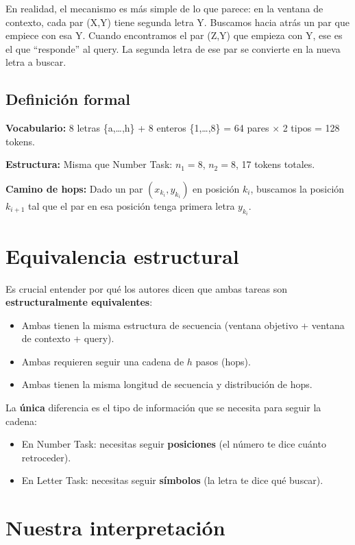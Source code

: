 \documentclass[12pt,a4paper,oneside]{report}
\begin{document}
En realidad, el mecanismo es más simple de lo que parece: en la ventana de contexto, cada par (X,Y) tiene segunda letra Y. Buscamos hacia atrás un par que empiece con esa Y. Cuando encontramos el par (Z,Y) que empieza con Y, ese es el que ``responde'' al query. La segunda letra de ese par se convierte en la nueva letra a buscar.

\subsection{Definición formal}

\textbf{Vocabulario:} 8 letras \{a,\dots,h\} + 8 enteros \{1,\dots,8\} = 64 pares $\times$ 2 tipos = 128 tokens.

\textbf{Estructura:} Misma que Number Task: $n_1 = 8$, $n_2 = 8$, 17 tokens totales.

\textbf{Camino de hops:} Dado un par $(x_{k_i}, y_{k_i})$ en posición $k_i$, buscamos la posición $k_{i+1}$ tal que el par en esa posición tenga primera letra $y_{k_i}$.

\section{Equivalencia estructural}

Es crucial entender por qué los autores dicen que ambas tareas son \textbf{estructuralmente equivalentes}:

\begin{itemize}
    \item Ambas tienen la misma estructura de secuencia (ventana objetivo + ventana de contexto + query).
    \item Ambas requieren seguir una cadena de $h$ pasos (hops).
    \item Ambas tienen la misma longitud de secuencia y distribución de hops.
\end{itemize}

La \textbf{única} diferencia es el tipo de información que se necesita para seguir la cadena:
\begin{itemize}
    \item En Number Task: necesitas seguir \textbf{posiciones} (el número te dice cuánto retroceder).
    \item En Letter Task: necesitas seguir \textbf{símbolos} (la letra te dice qué buscar).
\end{itemize}

\section{Nuestra interpretación}
\end{document}
